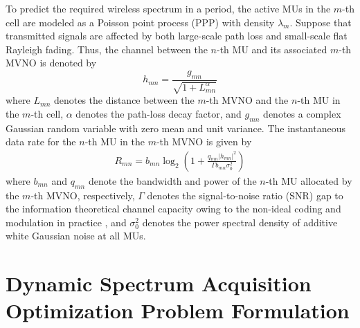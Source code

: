 \documentclass[journal]{IEEEtran}
\begin{document}
To predict the required wireless spectrum in a period, the active MUs in the $m$-th cell are modeled as a Poisson point process (PPP) with density $\lambda_m$. Suppose that transmitted signals are affected by both large-scale path loss and small-scale flat Rayleigh fading. Thus, the channel between the $n$-th MU and its associated $m$-th MVNO is denoted by
\begin{equation}
h_{mn}=\frac{g_{mn}}{\sqrt{1+L_{mn}^\alpha}}
\end{equation}
where $L_{mn}$ denotes the distance between the $m$-th MVNO and the $n$-th MU in the $m$-th cell, $\alpha$ denotes the path-loss decay factor, and $g_{mn}$ denotes a complex Gaussian random variable with zero mean and unit variance. The instantaneous data rate for the $n$-th MU in the $m$-th MVNO is given by
\begin{align}
R_{mn} = b_{mn}\log_2\left(1+\frac{q_{mn}\left|h_{mn}\right|^2 }{\Gamma b_{mn}\sigma_0^2}\right)
\end{align}
where $b_{mn}$ and $q_{mn}$ denote the bandwidth and power of the $n$-th MU allocated by the $m$-th MVNO, respectively, $\Gamma$ denotes the signal-to-noise ratio (SNR) gap to the information theoretical channel capacity owing to the non-ideal coding and modulation in practice \cite{JGDForney}, and $\sigma_0^2$ denotes the power spectral density of additive white Gaussian noise at all MUs.


\section{Dynamic Spectrum Acquisition Optimization Problem Formulation}
\end{document}
